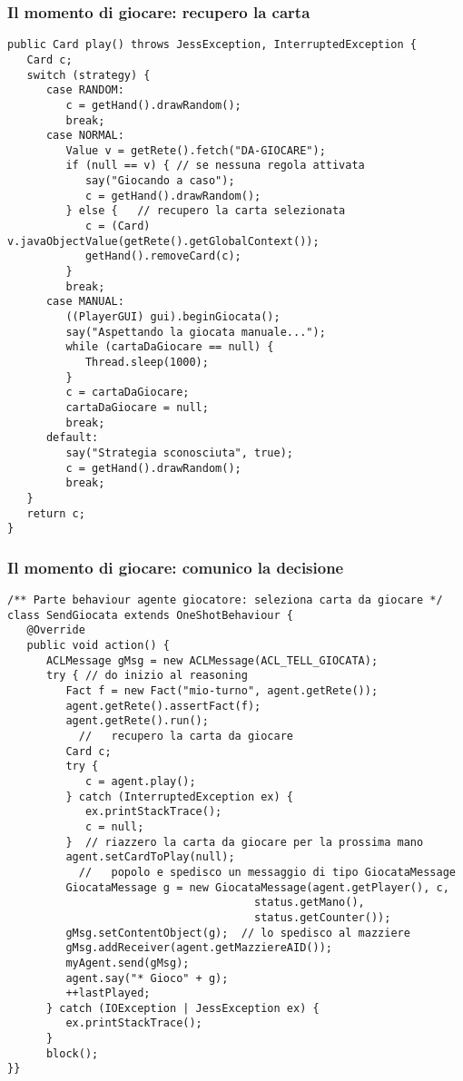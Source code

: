 \documentclass{beamer}
\begin{document}
\begin{frame}[fragile]
   \frametitle{Il momento di giocare: recupero la carta}
   \begin{lstlisting}
public Card play() throws JessException, InterruptedException {
   Card c;
   switch (strategy) {
      case RANDOM:
         c = getHand().drawRandom();
         break;
      case NORMAL:
         Value v = getRete().fetch("DA-GIOCARE");
         if (null == v) { // se nessuna regola attivata
            say("Giocando a caso");
            c = getHand().drawRandom();
         } else {	// recupero la carta selezionata
            c = (Card) v.javaObjectValue(getRete().getGlobalContext());
            getHand().removeCard(c);
         }
         break;
      case MANUAL:
         ((PlayerGUI) gui).beginGiocata();
         say("Aspettando la giocata manuale...");
         while (cartaDaGiocare == null) {
            Thread.sleep(1000);
         }
         c = cartaDaGiocare;
         cartaDaGiocare = null;
         break;
      default:
         say("Strategia sconosciuta", true);
         c = getHand().drawRandom();
         break;
   }
   return c;
}
   \end{lstlisting}
   
\end{frame}


\begin{frame}[fragile]
   \frametitle{Il momento di giocare: comunico la decisione}
%    
   
\begin{lstlisting}
/** Parte behaviour agente giocatore: seleziona carta da giocare */
class SendGiocata extends OneShotBehaviour {
   @Override
   public void action() {
      ACLMessage gMsg = new ACLMessage(ACL_TELL_GIOCATA);
      try {	// do inizio al reasoning
         Fact f = new Fact("mio-turno", agent.getRete());
         agent.getRete().assertFact(f);
         agent.getRete().run();
		   //	recupero la carta da giocare
         Card c;
         try {
            c = agent.play();
         } catch (InterruptedException ex) {
            ex.printStackTrace();
            c = null;
         }	// riazzero la carta da giocare per la prossima mano
         agent.setCardToPlay(null);
		   //	popolo e spedisco un messaggio di tipo GiocataMessage
         GiocataMessage g = new GiocataMessage(agent.getPlayer(), c,
                                      status.getMano(),
                                      status.getCounter());
         gMsg.setContentObject(g);	// lo spedisco al mazziere
         gMsg.addReceiver(agent.getMazziereAID());
         myAgent.send(gMsg);
         agent.say("* Gioco" + g);
         ++lastPlayed;
      } catch (IOException | JessException ex) {
         ex.printStackTrace();
      }
      block();
}}
\end{lstlisting}

\end{frame}
\end{document}
